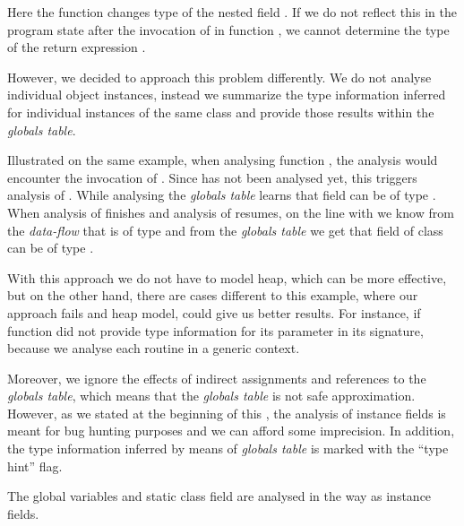         Here the function  changes type of the nested field 
        . If we do not reflect this in the program 
        state after the invocation of  in 
        function , we cannot determine the type of 
        the return expression .
        
        However, we decided to approach this problem differently. 
        We do not analyse individual object instances, 
        instead we summarize the type information inferred 
        for individual instances of the same class and provide 
        those results within the \emph{globals table}.
        
        Illustrated on the same example, when analysing function 
        , the analysis would encounter the invocation 
        of . Since  has not been analysed yet, 
        this triggers analysis of . While analysing 
         the \emph{globals table} learns that 
        field  can be of type . When analysis 
        of  finishes and analysis of  resumes, 
        on the line with  we know from the 
        \emph{data-flow} that  is of type  and 
        from the \emph{globals table} we get that field  
        of class  can be of type .
        
        With this approach we do not have to model heap, 
        which can be more effective, but on the other hand, 
        there are cases different to this example, where our 
        approach fails and heap model, could give us 
        better results. For instance, if function  
        did not provide type information for its parameter 
        in its signature, because we analyse each routine 
        in a generic context.
                
        Moreover, we ignore the effects of indirect assignments 
        and references to the \emph{globals table}, which means 
        that the \emph{globals table} is not safe approximation. 
        However, as we stated at the beginning of this \wsection{}, 
        the analysis of instance fields is meant for bug hunting 
        purposes and we can afford some imprecision. In addition, 
        the type information inferred by means of \emph{globals table} 
        is marked with the ``type hint'' flag.
        
        The global variables and static class field are analysed 
        in the way as instance fields.
        
